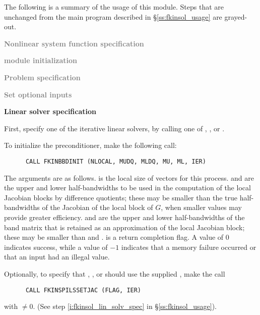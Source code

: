 The following is a summary of the usage of this module. Steps that are unchanged
from the main program described in \S\ref{ss:fkinsol_usage} are grayed-out.

\begin{Steps}
  
\item \textcolor{gray}{\bf Nonlinear system function specification}

\item \textcolor{gray}{\bf {\nvector} module initialization}

\item \textcolor{gray}{\bf Problem specification}

\item \textcolor{gray}{\bf Set optional inputs}

\item {\bf Linear solver specification}

  First, specify one of the {\kinspils} iterative linear solvers, by calling
  one of , , or .

  To initialize the {\kinbbdpre} preconditioner, make the following call:
\begin{verbatim}
      CALL FKINBBDINIT (NLOCAL, MUDQ, MLDQ, MU, ML, IER)
\end{verbatim}
  The arguments are as follows.
   is the local size of vectors for this process.
   and  are the upper and lower half-bandwidths to be used
  in the computation of the local Jacobian blocks by difference quotients;
  these may be smaller than the true half-bandwidths of the Jacobian of the
  local block of $G$, when smaller values may provide greater efficiency.
   and  are the upper and lower half-bandwidths of the band
  matrix that is retained as an approximation of the local Jacobian block;
  these may be smaller than  and .
   is a return completion flag.  A value of $0$ indicates success, while
  a value of $-1$ indicates that a memory failure occurred or that an input had
  an illegal value.

  Optionally, to specify that {\spgmr}, {\spbcg}, or {\sptfqmr} should use
  the supplied , make the call
\begin{verbatim}
      CALL FKINSPILSSETJAC (FLAG, IER)
\end{verbatim}
  with  $\neq 0$.
  (See step \ref{i:fkinsol_lin_solv_spec} in \S\ref{ss:fkinsol_usage}).


\end{Steps}
